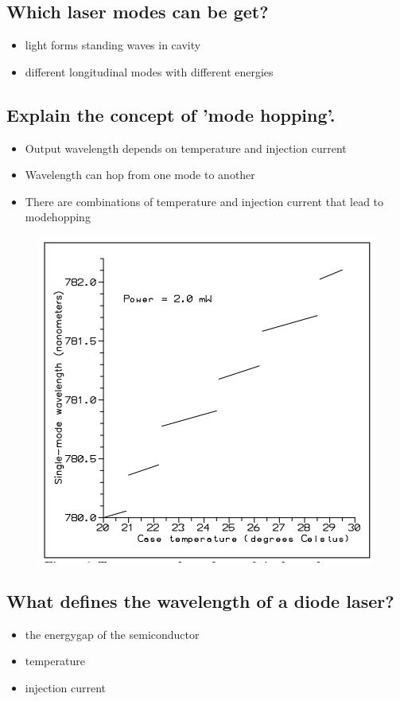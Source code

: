 \subsection{Which laser modes can be get?}
\begin{itemize}
    \item light forms standing waves in cavity 
    \item different longitudinal modes with different energies
\end{itemize}
\subsection{Explain the concept of 'mode hopping'.}
\begin{itemize}
    \item Output wavelength depends on temperature and injection current
    \item Wavelength can hop from one mode to another 
    \item There are combinations of temperature and injection current that
    lead to modehopping
\end{itemize}
\begin{figure}
    \includegraphics{pictures/hop.png}
\end{figure}
\subsection{What defines the wavelength of a diode laser?}
\begin{itemize}
    \item the energygap of the semiconductor
    \item temperature
    \item injection current
\end{itemize}
